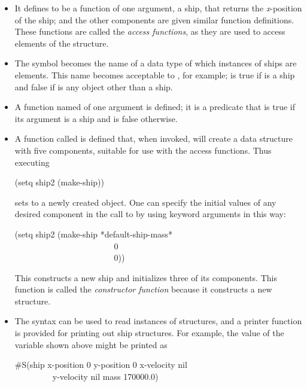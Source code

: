 \begin{itemize}
\item
It defines  to be a function
of one argument, a ship, that returns the \emph{x}-position
of the ship; 
and the other components are given similar function definitions.
These functions are called the \emph{access functions}, as they
are used to access elements of the structure.

\item
The symbol  becomes the name of a data type of which instances
of ships are elements.  This name becomes acceptable to ,
for example;  is true if  is a ship
and false if  is any object other than a ship.

\item
A function named  of one argument is defined; it is a predicate
that is true if its argument is a ship and is false otherwise.

\item
A function called  is defined that, when invoked,
will create a data structure with five components, suitable for use with
the access functions.  Thus executing
\begin{lisp}
(setq ship2 (make-ship))
\end{lisp}
sets  to a newly created  object.
One can specify the initial values of any desired component in the call
to  by using keyword arguments in this way:
\begin{lisp}
(setq ship2 (make-ship  *default-ship-mass* \\
~~~~~~~~~~~~~~~~~~~~~~~ 0 \\
~~~~~~~~~~~~~~~~~~~~~~~ 0))
\end{lisp}
This constructs a new ship and initializes three of its components.
This function is called the \emph{constructor function}
because it constructs a new structure.

\item
The  syntax can be used to read instances of 
structures, and a printer function is provided for printing
out ship structures.  For example, the value of the
variable  shown above might be printed as
\begin{lisp}
\#S(ship  x-position 0  y-position 0  x-velocity nil \\
~~~~~~~~~y-velocity nil  mass 170000.0)
\end{lisp}


\end{itemize}
